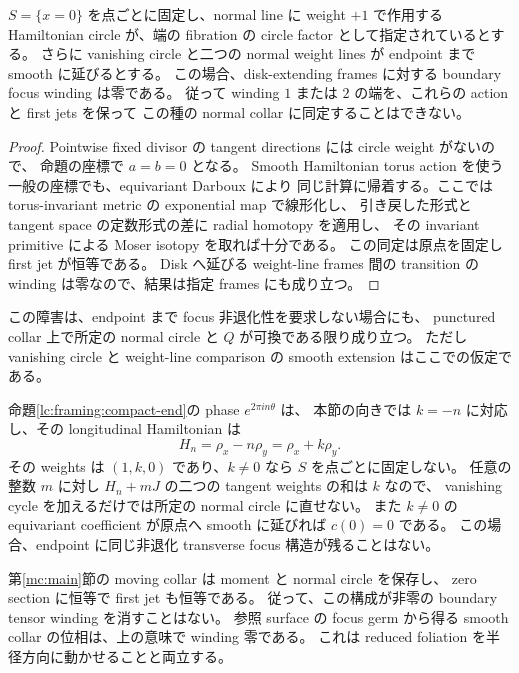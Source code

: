 \begin{corollary}
\label{cw:divisor}
$S=\{x=0\}$ を点ごとに固定し、normal line に weight $+1$ で作用する
Hamiltonian circle が、端の fibration の circle factor として指定されているとする。
さらに vanishing circle と二つの normal weight lines が endpoint まで smooth に延びるとする。
この場合、disk-extending frames に対する boundary focus winding は零である。
従って winding $1$ または $2$ の端を、これらの action と first jets を保って
この種の normal collar に同定することはできない。
\end{corollary}

\begin{proof}
Pointwise fixed divisor の tangent directions には circle weight がないので、
命題の座標で $a=b=0$ となる。
Smooth Hamiltonian torus action を使う一般の座標でも、equivariant Darboux により
同じ計算に帰着する。ここでは torus-invariant metric の exponential map で線形化し、
引き戻した形式と tangent space の定数形式の差に radial homotopy を適用し、
その invariant primitive による Moser isotopy を取れば十分である。
この同定は原点を固定し first jet が恒等である。
Disk へ延びる weight-line frames 間の transition の winding は零なので、結果は指定 frames にも成り立つ。
\end{proof}

この障害は、endpoint まで focus 非退化性を要求しない場合にも、
punctured collar 上で所定の normal circle と $Q$ が可換である限り成り立つ。
ただし vanishing circle と weight-line comparison の smooth extension はここでの仮定である。

命題\ref{lc:framing:compact-end}の phase $e^{2\pi in\theta}$ は、
本節の向きでは $k=-n$ に対応し、その longitudinal Hamiltonian は
\[
 H_n=\rho_x-n\rho_y=\rho_x+k\rho_y.
\]
その weights は $(1,k,0)$ であり、$k\ne0$ なら $S$ を点ごとに固定しない。
任意の整数 $m$ に対し $H_n+mJ$ の二つの tangent weights の和は $k$ なので、
vanishing cycle を加えるだけでは所定の normal circle に直せない。
また $k\ne0$ の equivariant coefficient が原点へ smooth に延びれば $c(0)=0$ である。
この場合、endpoint に同じ非退化 transverse focus 構造が残ることはない。

第\ref{mc:main}節の moving collar は moment と normal circle を保存し、
zero section に恒等で first jet も恒等である。
従って、この構成が非零の boundary tensor winding を消すことはない。
参照 surface の focus germ から得る smooth collar の位相は、上の意味で winding 零である。
これは reduced foliation を半径方向に動かせることと両立する。

